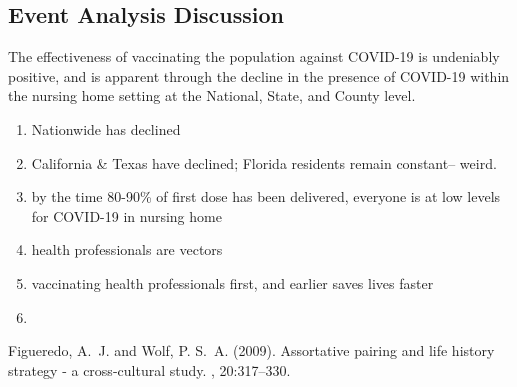 \documentclass[twoside]{article}
\begin{document}
\begin{multicols}{2}
\subsection{Event Analysis Discussion}

The effectiveness of vaccinating the population against COVID-19 is undeniably positive, and is apparent through the decline in the presence of COVID-19 within the nursing home setting at the National, State, and County level. 

\vspace{5mm}

\begin{enumerate}
	\item Nationwide has declined
	\item California \& Texas have declined; Florida residents remain constant-- weird.
	\item by the time 80-90\% of first dose has been delivered, everyone is at low levels for COVID-19 in nursing home
	\item health professionals are vectors
	\item vaccinating health professionals first, and earlier saves lives faster
	\item 
	
\end{enumerate} 


\begin{thebibliography}{99} %

Figueredo, A.~J. and Wolf, P. S.~A. (2009).
\newblock Assortative pairing and life history strategy - a cross-cultural
  study.
, 20:317--330.
 
\end{thebibliography}


\end{multicols}
\end{document}
